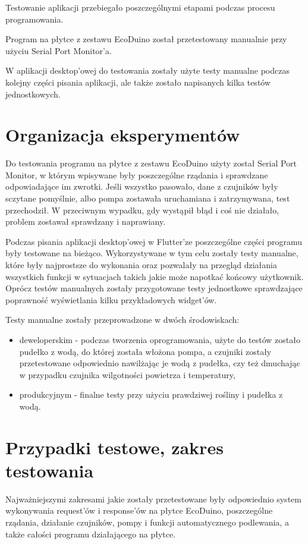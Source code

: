 \documentclass[a4paper,twoside,12pt]{book}
\begin{document}
Testowanie aplikacji przebiegało poszczególnymi etapami podczas procesu programowania.

Program na płytce z zestawu EcoDuino został przetestowany manualnie przy użyciu Serial Port Monitor'a.

W aplikacji desktop'owej do testowania zostały użyte testy manualne podczas kolejny części pisania aplikacji, ale także zostało napisanych kilka testów jednostkowych.

\section{Organizacja eksperymentów}

Do testowania programu na płytce z zestawu EcoDuino użyty został Serial Port Monitor, w którym wpisywane były poszczególne rządania i sprawdzane odpowiadające im zwrotki. Jeśli wszystko pasowało, dane z czujników były sczytane pomyślnie, albo pompa zostawała uruchamiana i zatrzymywana, test przechodził. W przeciwnym wypadku, gdy wystąpił błąd i coś nie działało, problem zostawał sprawdzany i naprawiany.

Podczas pisania aplikacji desktop'owej w Flutter'ze poszczególne części programu były testowane na bieżąco. Wykorzystywane w tym celu zostały testy manualne, które były najprostsze do wykonania oraz pozwalały na przegląd działania wszystkich funkcji w sytuacjach takich jakie może napotkać końcowy użytkownik. Oprócz testów manualnych zostały przygotowane testy jednostkowe sprawdzające poprawność wyświetlania kilku przykładowych widget'ów.

Testy manualne zostały przeprowadzone w dwóch środowiskach:

\begin{itemize}
   \item deweloperskim - podczas tworzenia oprogramowania, użyte do testów zostało pudełko z wodą, do której została włożona pompa, a czujniki zostały przetestowane odpowiednio nawilżając je wodą z pudełka, czy też dmuchając w przypadku czujnika wilgotności powietrza i temperatury,
   \item produkcyjnym - finalne testy przy użyciu prawdziwej rośliny i pudełka z wodą.
\end{itemize}

\section{Przypadki testowe, zakres testowania}

Najważniejszymi zakresami jakie zostały przetestowane były odpowiednio system wykonywania request'ów i response'ów na płytce EcoDuino, poszczególne rządania, działanie czujników, pompy i funkcji automatycznego podlewania, a także całości programu działającego na płytce.
\end{document}
